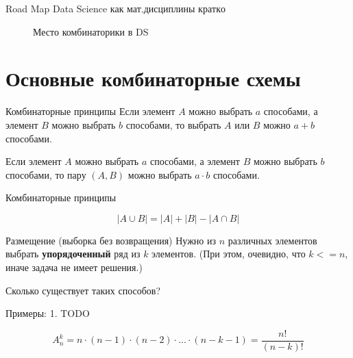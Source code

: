 \begin{frame}
	Road Map Data Science как мат.дисциплины \(кратко\)
	\begin{center}
		\begin{figure}
			
			\caption{Место комбинаторики в DS}
		\end{figure}	
	\end{center}
	
\end{frame}

\section{Основные комбинаторные схемы}\label{section:main_combinatorics_sxems}

\begin{frame}{Комбинаторные принципы}
Если элемент $A$ можно выбрать $a$ способами,
а элемент $B$ можно выбрать $b$ способами,
то выбрать $A$ или $B$ 
можно $a+b$ способами.

Если элемент $A$ можно выбрать $a$ способами,
а элемент $B$ можно выбрать $b$ способами,
то пару $(A, B)$ 
можно выбрать $a \cdot b$ способами.

\end{frame}

\begin{frame}{Комбинаторные принципы}




\begin{equation}
\left| A \cup B \right| = \left|  A \right| + \left|  B \right| - \left| A \cap B \right|
\end{equation}


\end{frame}

\begin{frame}{Размещение (выборка без возвращения)}
Нужно из
$n$
различных элементов 
выбрать \textbf{упорядоченный}
ряд из $k$
элементов. 
(При этом, очевидно, что $k <=n$,
иначе задача не имеет решения.)

Сколько существует таких способов?   

Примеры:
1. TODO

\begin{equation}
A_n^k = n \cdot (n-1) \cdot (n-2) \cdot ... \cdot (n-k-1) = \frac{n!} {\left(n-k\right)!}
\end{equation}    


\end{frame}

